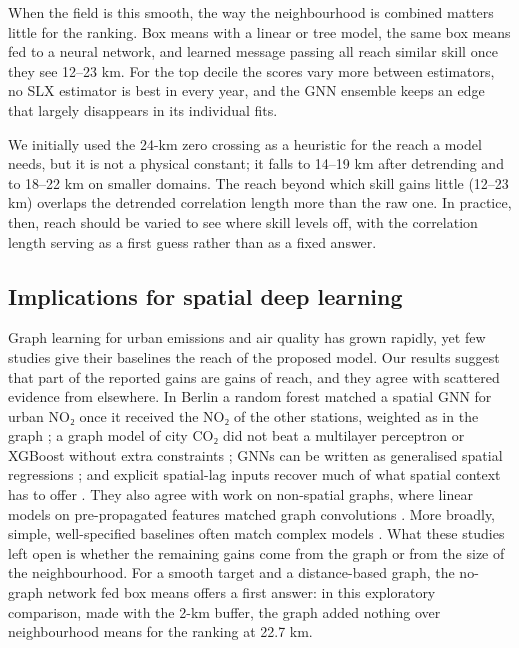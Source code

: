 \documentclass[pdflatex,sn-basic]{sn-jnl}
\begin{document}
When the field is this smooth, the way the neighbourhood is combined matters little for the ranking. Box means with a linear or tree model, the same box means fed to a neural network, and learned message passing all reach similar skill once they see 12--23 km. For the top decile the scores vary more between estimators, no SLX estimator is best in every year, and the GNN ensemble keeps an edge that largely disappears in its individual fits.

We initially used the 24-km zero crossing as a heuristic for the reach a model needs, but it is not a physical constant; it falls to 14--19 km after detrending and to 18--22 km on smaller domains. The reach beyond which skill gains little (12--23 km) overlaps the detrended correlation length more than the raw one. In practice, then, reach should be varied to see where skill levels off, with the correlation length serving as a first guess rather than as a fixed answer.

\subsection{Implications for spatial deep learning}\label{sec:implications}

Graph learning for urban emissions and air quality has grown rapidly, yet few studies give their baselines the reach of the proposed model. Our results suggest that part of the reported gains are gains of reach, and they agree with scattered evidence from elsewhere. In Berlin a random forest matched a spatial GNN for urban NO₂ once it received the NO₂ of the other stations, weighted as in the graph \citep{schmidt2026}; a graph model of city CO₂ did not beat a multilayer perceptron or XGBoost without extra constraints \citep{shao2026}; GNNs can be written as generalised spatial regressions \citep{liang2023,zhu2026}; and explicit spatial-lag inputs recover much of what spatial context has to offer \citep{xiao2023,schmidinger2026}. They also agree with work on non-spatial graphs, where linear models on pre-propagated features matched graph convolutions \citep{wu2019,frasca2020}. More broadly, simple, well-specified baselines often match complex models \citep{ferraridacrema2019,zeng2023}. What these studies left open is whether the remaining gains come from the graph or from the size of the neighbourhood. For a smooth target and a distance-based graph, the no-graph network fed box means offers a first answer: in this exploratory comparison, made with the 2-km buffer, the graph added nothing over neighbourhood means for the ranking at 22.7 km.
\end{document}
